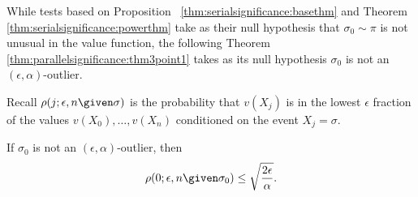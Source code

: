 \documentclass[12pt]{article}
\begin{document}
While tests based on Proposition~%
\ref{thm:serialsignificance:basethm} and Theorem~%
\ref{thm:serialsignificance:powerthm} take as their null hypothesis that
\( \sigma_0 \sim \pi \) is not unusual in the value function, the
following Theorem~%
\ref{thm:parallelsignificance:thm3point1} takes as its null hypothesis \(
\sigma_{0} \) is not an \( (\epsilon, \alpha) \)-outlier.

Recall \( \rho(j; \epsilon, n \given \sigma) \) is the probability that \(
v(X_j) \) is in the lowest \( \epsilon \) fraction of the values \( v(X_0),
\dots, v(X_n) \) conditioned on the event \( X_j = \sigma \).

\begin{lemma}
    If \( \sigma_0 \) is not an \( (\epsilon,\alpha) \)-outlier, then
    \[
        \label{eq:parallelsignificance:nine} \rho(0; \epsilon, n \given
        \sigma_0) \le \sqrt{\frac{2 \epsilon}{\alpha}}.
    \]
\end{lemma}
\end{document}
